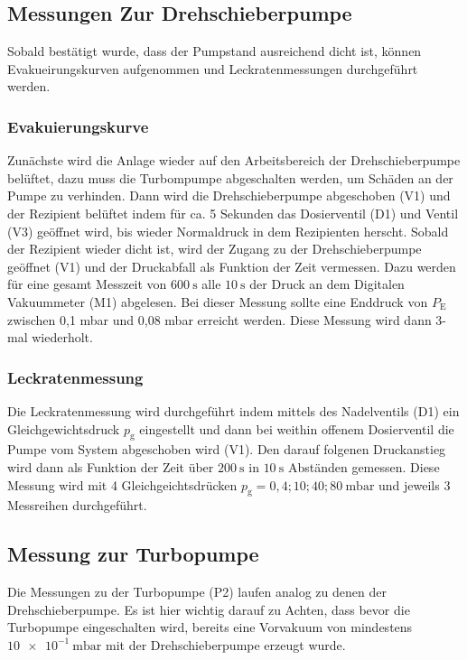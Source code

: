 	\subsection{Messungen Zur Drehschieberpumpe}

		Sobald bestätigt wurde, dass der Pumpstand ausreichend dicht ist, können Evakueirungskurven aufgenommen und Leckratenmessungen durchgeführt werden.

		\subsubsection{Evakuierungskurve}

			Zunächste wird die Anlage wieder auf den Arbeitsbereich der Drehschieberpumpe belüftet, dazu muss die Turbompumpe abgeschalten werden, um Schäden an der Pumpe zu verhinden.
			Dann wird die Drehschieberpumpe abgeschoben (V1) und der Rezipient belüftet indem für ca. 5 Sekunden das Dosierventil (D1) und Ventil (V3) geöffnet wird, bis wieder Normaldruck in dem Rezipienten herscht. 
			Sobald der Rezipient wieder dicht ist, wird der Zugang zu der Drehschieberpumpe geöffnet (V1) und der Druckabfall als Funktion der Zeit vermessen. 
			Dazu werden für eine gesamt Messzeit von $\SI{600}{\second}$ alle $\SI{10}{\second}$ der Druck an dem Digitalen Vakuummeter (M1) abgelesen.
			Bei dieser Messung sollte eine Enddruck von $P_\text{E}$ zwischen 0,1 mbar und 0,08 mbar erreicht werden.
			Diese Messung wird dann 3-mal wiederholt.

		\subsubsection{Leckratenmessung}

		 	Die Leckratenmessung wird durchgeführt indem mittels des Nadelventils (D1) ein Gleichgewichtsdruck $p_\text{g}$ eingestellt und dann bei weithin offenem Dosierventil die Pumpe vom System abgeschoben wird (V1).
			Den darauf folgenen Druckanstieg wird dann als Funktion der Zeit über $\SI{200}{\second}$ in $\SI{10}{\second}$ Abständen gemessen. 
			Diese Messung wird mit 4 Gleichgeichtsdrücken $p_\text{g} = 0,4; 10; 40; \SI{80}{\milli\bar}$ und jeweils 3 Messreihen durchgeführt.

	\subsection{Messung zur Turbopumpe}

		Die Messungen zu der Turbopumpe (P2) laufen analog zu denen der Drehschieberpumpe. 
		Es ist hier wichtig darauf zu Achten, dass bevor die Turbopumpe eingeschalten wird, bereits eine Vorvakuum von mindestens $\SI{10e-1}{\milli\bar}$ mit der Drehschieberpumpe erzeugt wurde.
		
